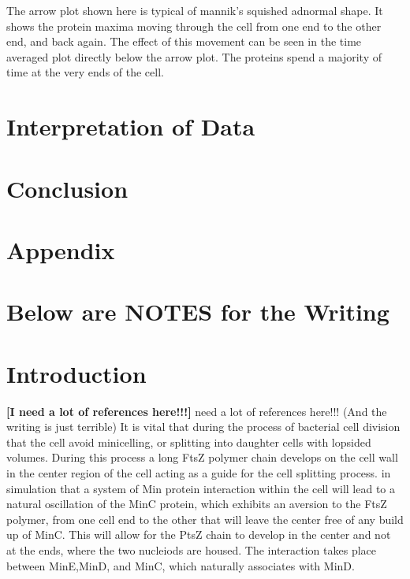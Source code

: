 \documentclass[letterpaper,twocolumn,amsmath,amssymb,pre]{revtex4-1}
\newcommand{\red}[1]{{\bf \color{red} #1}}
\newcommand{\fixme}[1]{\red{[#1]}}
\begin{document}
The arrow plot shown here is typical of mannik's squished adnormal
shape.  It shows the protein maxima moving through the cell from one
end to the other end, and back again.  The effect of this movement can
be seen in the time averaged plot directly below the arrow plot.  The
proteins spend a majority of time at the very ends of the cell.




\section{Interpretation of Data}
\section{Conclusion}
\section*{Appendix}












\section{Below are NOTES for the Writing}













\section{Introduction}
\fixme{I need a lot of references here!!!}
 need a lot of references here!!!  (And the writing is just
terrible) It is vital that during the process of bacterial cell
division that the cell avoid minicelling, or splitting into daughter
cells with lopsided volumes.  During this process a long FtsZ polymer
chain develops on the cell wall in the center region of the cell
acting as a guide for the cell splitting process.  in simulation that a system of Min protein interaction within
the cell will lead to a natural oscillation of the MinC protein, which
exhibits an aversion to the FtsZ polymer, from one cell end to the
other that will leave the center free of any build up of MinC.  This
will allow for the PtsZ chain to develop in the center and not at the
ends, where the two nucleiods are housed.  The interaction takes place
between MinE,MinD, and MinC, which naturally associates with MinD.
\end{document}
